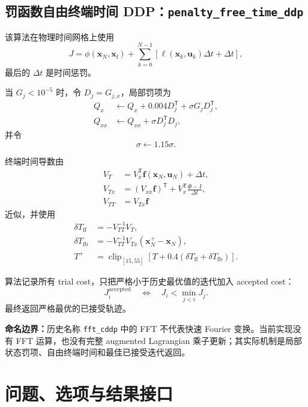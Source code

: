 \documentclass[UTF8,zihao=-4,openany,fontset=fandol]{ctexbook}
\newcommand{\code}[1]{\nolinkurl{#1}}
\newcommand{\clip}{\operatorname{clip}}
\newcommand{\important}[1]{%
  \begin{center}
  \colorbox{ddlight}{\parbox{0.91\textwidth}{#1}}
  \end{center}}
\begin{document}
\section{罚函数自由终端时间 DDP：\texorpdfstring{\texttt{penalty\_free\_time\_ddp}}{penalty-free-time-ddp}}

该算法在物理时间网格上使用
\begin{equation}
  J=
  \phi(\bm{x}_N,\bm{x}_{\mathrm f})
  +\sum_{k=0}^{N-1}
  \left[
  \ell(\bm{x}_k,\bm{u}_k)\Delta t+\Delta t
  \right],
\end{equation}
最后的 $\Delta t$ 是时间惩罚。

当 $G_j<10^{-5}$ 时，令 $D_j=G_{j,x}$，局部罚项为
\begin{align}
  Q_x&\leftarrow Q_x+
  0.004D_j^\mathsf{T}
  +\sigma G_jD_j^\mathsf{T},\\
  Q_{xx}&\leftarrow Q_{xx}
  +\sigma D_j^\mathsf{T}D_j,
\end{align}
并令
\[
  \sigma\leftarrow1.15\sigma.
\]

终端时间导数由
\begin{align}
  V_T&=V_x^\mathsf{T}\bm{f}(\bm{x}_N,\bm{u}_N)+\Delta t,\\
  V_{Tx}&=
  \left(V_{xx}\bm{f}\right)^\mathsf{T}
  +V_x^\mathsf{T}\frac{\Phi-I}{\Delta t},\\
  V_{TT}&=V_{Tx}\bm{f}
\end{align}
近似，并使用
\begin{align}
  \delta T_{\mathrm{ff}}&=-V_{TT}^{-1}V_T,\\
  \delta T_{\mathrm{fb}}&=
  -V_{TT}^{-1}V_{Tx}(\bm{x}_N^+-\bm{x}_N),\\
  T^+&=
  \clip_{[15,55]}
  \left[T+0.4(\delta T_{\mathrm{ff}}+\delta T_{\mathrm{fb}})\right].
\end{align}

算法记录所有 trial cost，只把严格小于历史最优值的迭代加入 accepted cost：
\begin{equation}
  J_i^{\mathrm{accepted}}
  \quad\Longleftrightarrow\quad
  J_i<\min_{j<i}J_j.
\end{equation}
最终返回严格最优的已接受轨迹。

\important{\textbf{命名边界：}历史名称 \code{fft_cddp} 中的 FFT 不代表快速 Fourier 变换。当前实现没有 FFT 运算，也没有完整 augmented Lagrangian 乘子更新；其实际机制是局部状态罚项、自由终端时间和最佳已接受迭代返回。}



\chapter{问题、选项与结果接口}
\end{document}
